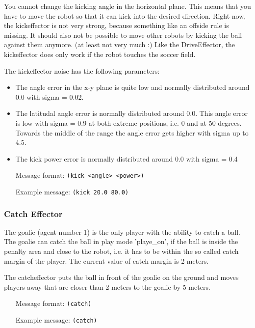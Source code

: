 You cannot change the kicking angle in the horizontal plane. This
means that you have to move the robot so that it can kick into the
desired direction. Right now, the kickeffector is not very strong,
because something like an offside rule is missing. It should also not
be possible to move other robots by kicking the ball against them
anymore. (at least not very much :) Like the DriveEffector, the
kickeffector does only work if the robot touches the soccer field.

The kickeffector noise has the following parameters: 
\begin{itemize}
\item The angle error in the x-y plane is quite low and normally distributed
around 0.0 with sigma = 0.02.
\item The latitudal angle error is normally distributed around 0.0. This
angle error is low with sigma = 0.9 at both extreme positions, i.e. 0
and at 50 degrees. Towards the middle of the range the angle error
gets higher with sigma up to 4.5.
\item The kick power error is normally distributed around 0.0 with sigma =
0.4
\end{itemize}

\begin{itemize}
	\item[Message format:] \texttt{(kick <angle> <power>)}
	\item[Example message:] \texttt{(kick 20.0 80.0)}
\end{itemize}

\subsubsection{Catch Effector}
The goalie (agent number 1) is the only player with the ability to
catch a ball. The goalie can catch the ball in play mode 'playe\_on',
if the ball is inside the penalty area and close to the robot, i.e. it
has to be within the so called catch margin of the player. The current
value of catch margin is 2 meters.

The catcheffector puts the ball in front of the goalie on the ground
and moves players away that are closer than 2 meters to the goalie by
5 meters.

\begin{itemize}
	\item[Message format:] \texttt{(catch)}
	\item[Example message:] \texttt{(catch)}
\end{itemize}

